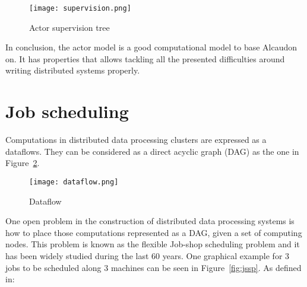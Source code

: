 \begin{figure}[!h]
\begin{center}
\texttt{[image: supervision.png]}
\caption{Actor supervision tree}
\label{fig:supervision}
\end{center}
\end{figure}

In conclusion, the actor model is a good computational model to base Alcaudon
on. It has properties that allows tackling all the presented difficulties around
writing distributed systems properly.

\section{Job scheduling}

Computations in distributed data processing clusters are expressed as a
dataflows. They can be considered as a direct acyclic graph (DAG) as the one in
Figure~\ref{fig:dataflow}.

\begin{figure}[h!]
\begin{center}
\texttt{[image: dataflow.png]}
\caption{Dataflow}
\label{fig:dataflow}
\end{center}
\end{figure}

One open problem in the construction of distributed data processing systems is
how to place those computations represented as a \acs{DAG}, given a set of computing
nodes. This problem is known as the flexible Job-shop scheduling problem and it
has been widely studied during the last 60 years. One graphical example for $3$
jobs to be scheduled along $3$ machines can be seen in Figure~\ref{fig:jssp}.
As defined in\cite{jobshop2}:

